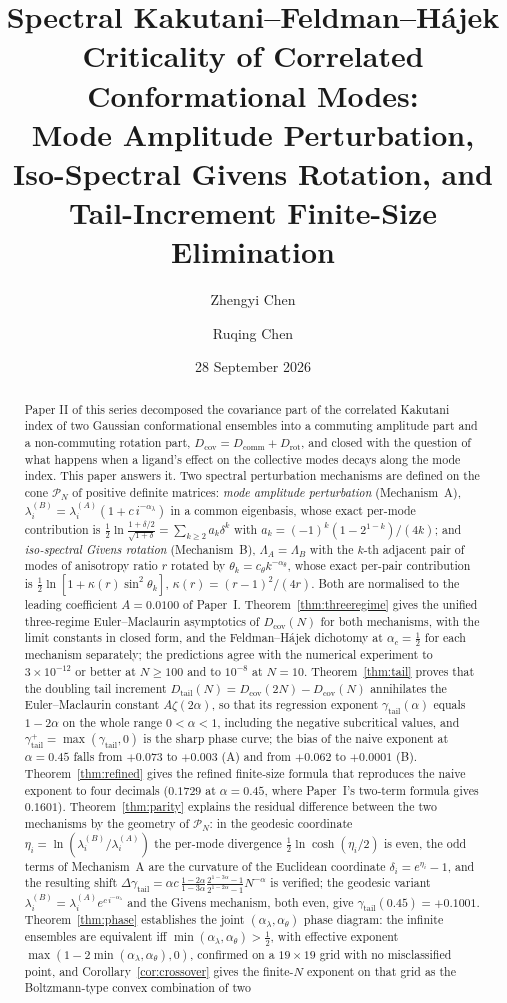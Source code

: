 \documentclass[11pt,reqno]{amsart}
\title[Spectral Kakutani--Feldman--H\'ajek criticality]{Spectral Kakutani--Feldman--H\'ajek Criticality of Correlated Conformational Modes:\\ Mode Amplitude Perturbation, Iso-Spectral Givens Rotation, and Tail-Increment Finite-Size Elimination}
\author[Z. Chen]{Zhengyi Chen}
\author[R. Chen]{Ruqing Chen}
\date{28 September 2026}
\theoremstyle{plain}
\theoremstyle{definition}
\theoremstyle{remark}
\numberwithin{equation}{section}
\newcommand{\Dcov}{D_{\mathrm{cov}}}
\newcommand{\Dcomm}{D_{\mathrm{comm}}}
\newcommand{\Drot}{D_{\mathrm{rot}}}
\newcommand{\Dtail}{D_{\mathrm{tail}}}
\newcommand{\gtail}{\gamma_{\mathrm{tail}}}
\newcommand{\PN}{\mathcal{P}_N}
\begin{document}
\begin{abstract}
Paper II of this series \cite{ChenChen2026II} decomposed the covariance part of the correlated Kakutani index of two Gaussian conformational ensembles into a commuting amplitude part and a non-commuting rotation part, $\Dcov=\Dcomm+\Drot$, and closed with the question of what happens when a ligand's effect on the collective modes decays along the mode index. This paper answers it. Two spectral perturbation mechanisms are defined on the cone $\PN$ of positive definite matrices: \emph{mode amplitude perturbation} (Mechanism~A), $\lambda^{(B)}_i=\lambda^{(A)}_i(1+c\,i^{-\alpha_\lambda})$ in a common eigenbasis, whose exact per-mode contribution is $\tfrac12\ln\frac{1+\delta/2}{\sqrt{1+\delta}}=\sum_{k\ge2}a_k\delta^k$ with $a_k=(-1)^k(1-2^{1-k})/(4k)$; and \emph{iso-spectral Givens rotation} (Mechanism~B), $\Lambda_A=\Lambda_B$ with the $k$-th adjacent pair of modes of anisotropy ratio $r$ rotated by $\theta_k=c_\theta k^{-\alpha_\theta}$, whose exact per-pair contribution is $\tfrac12\ln[1+\kappa(r)\sin^2\theta_k]$, $\kappa(r)=(r-1)^2/(4r)$. Both are normalised to the leading coefficient $A=0.0100$ of Paper~I. Theorem~\ref{thm:threeregime} gives the unified three-regime Euler--Maclaurin asymptotics of $\Dcov(N)$ for both mechanisms, with the limit constants in closed form, and the Feldman--H\'ajek dichotomy at $\alpha_c=\tfrac12$ for each mechanism separately; the predictions agree with the numerical experiment to $3\times10^{-12}$ or better at $N\ge100$ and to $10^{-8}$ at $N=10$. Theorem~\ref{thm:tail} proves that the doubling tail increment $\Dtail(N)=\Dcov(2N)-\Dcov(N)$ annihilates the Euler--Maclaurin constant $A\zeta(2\alpha)$, so that its regression exponent $\gtail(\alpha)$ equals $1-2\alpha$ on the whole range $0<\alpha<1$, including the negative subcritical values, and $\gtail^+=\max(\gtail,0)$ is the sharp phase curve; the bias of the naive exponent at $\alpha=0.45$ falls from $+0.073$ to $+0.003$ (A) and from $+0.062$ to $+0.0001$ (B). Theorem~\ref{thm:refined} gives the refined finite-size formula that reproduces the naive exponent to four decimals ($0.1729$ at $\alpha=0.45$, where Paper~I's two-term formula gives $0.1601$). Theorem~\ref{thm:parity} explains the residual difference between the two mechanisms by the geometry of $\PN$: in the geodesic coordinate $\eta_i=\ln(\lambda^{(B)}_i/\lambda^{(A)}_i)$ the per-mode divergence $\tfrac12\ln\cosh(\eta_i/2)$ is even, the odd terms of Mechanism~A are the curvature of the Euclidean coordinate $\delta_i=e^{\eta_i}-1$, and the resulting shift $\Delta\gtail=\alpha c\,\frac{1-2\alpha}{1-3\alpha}\frac{2^{1-3\alpha}-1}{2^{1-2\alpha}-1}N^{-\alpha}$ is verified; the geodesic variant $\lambda^{(B)}_i=\lambda^{(A)}_ie^{c\,i^{-\alpha_\lambda}}$ and the Givens mechanism, both even, give $\gtail(0.45)=+0.1001$. Theorem~\ref{thm:phase} establishes the joint $(\alpha_\lambda,\alpha_\theta)$ phase diagram: the infinite ensembles are equivalent iff $\min(\alpha_\lambda,\alpha_\theta)>\tfrac12$, with effective exponent $\max(1-2\min(\alpha_\lambda,\alpha_\theta),0)$, confirmed on a $19\times19$ grid with no misclassified point, and Corollary~\ref{cor:crossover} gives the finite-$N$ exponent on that grid as the Boltzmann-type convex combination of two 
\end{abstract}
\end{document}
